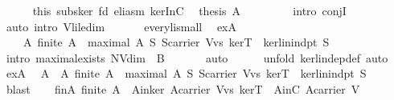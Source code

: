 \begin{isabellebody}
\ \ \ \ \isamarkupfalse%
\ this\ subs{\isacharunderscore}ker\ fd\ eli{\isacharunderscore}asm\ kerInC\ \isamarkupfalse%
\ {\isachardoublequoteopen}{\isacharquery}thesis\ A{\isachardoublequoteclose}\ \isanewline
\ \ \ \ \ \ \isamarkupfalse%
\ {\isacharparenleft}intro\ conjI{\isacharparenright}\ \isanewline
\ \ \ \ \ \ \ \isamarkupfalse%
\ {\isacharparenleft}auto\ intro{\isacharbang}{\isacharcolon}\ V{\isachardot}li{\isacharunderscore}le{\isacharunderscore}dim{\isacharparenright}\isanewline
\ \ \isamarkupfalse%
\isanewline
\ \ \isamarkupfalse%
\ every{\isacharunderscore}li{\isacharunderscore}small\ \isamarkupfalse%
\ exA{\isacharcolon}\ \isanewline
\ \ \ \ {\isachardoublequoteopen}{\isasymexists}A{\isachardot}\ finite\ A\ {\isasymand}\ maximal\ A\ {\isacharparenleft}{\isasymlambda}S{\isachardot}\ S{\isasymsubseteq}carrier\ {\isacharparenleft}V{\isachardot}vs\ kerT{\isacharparenright}\ {\isasymand}\ ker{\isachardot}lin{\isacharunderscore}indpt\ S{\isacharparenright}{\isachardoublequoteclose}\isanewline
\ \ \ \ \isamarkupfalse%
\ {\isacharparenleft}intro\ maximal{\isacharunderscore}exists{\isacharbrackleft}\ {\isacharquery}N{\isacharequal}{\isachardoublequoteopen}V{\isachardot}dim{\isachardoublequoteclose}\ \ {\isacharquery}B{\isacharequal}{\isachardoublequoteopen}{\isacharbraceleft}{\isacharbraceright}{\isachardoublequoteclose}{\isacharbrackright}{\isacharparenright}\isanewline
\ \ \ \ \ \isamarkupfalse%
\ auto\isanewline
\ \ \ \ \isamarkupfalse%
\ {\isacharparenleft}unfold\ ker{\isachardot}lin{\isacharunderscore}dep{\isacharunderscore}def{\isacharcomma}\ auto{\isacharparenright}\isanewline
\ \ \isamarkupfalse%
\ exA\ \isamarkupfalse%
\ A\ \ A{\isacharcolon}{\isachardoublequoteopen}\ finite\ A\ {\isasymand}\ maximal\ A\ {\isacharparenleft}{\isasymlambda}S{\isachardot}\ S{\isasymsubseteq}carrier\ {\isacharparenleft}V{\isachardot}vs\ kerT{\isacharparenright}\ {\isasymand}\ ker{\isachardot}lin{\isacharunderscore}indpt\ S{\isacharparenright}{\isachardoublequoteclose}\ \isanewline
\ \ \ \ \isamarkupfalse%
\ blast\isanewline
\ \ \isamarkupfalse%
\ finA{\isacharcolon}\ {\isachardoublequoteopen}finite\ A{\isachardoublequoteclose}\ \ Ainker{\isacharcolon}\ {\isachardoublequoteopen}A{\isasymsubseteq}carrier\ {\isacharparenleft}V{\isachardot}vs\ kerT{\isacharparenright}{\isachardoublequoteclose}\ \ AinC{\isacharcolon}\ {\isachardoublequoteopen}A{\isasymsubseteq}carrier\ V{\isachardoublequoteclose}\isanewline

\end{isabellebody}
